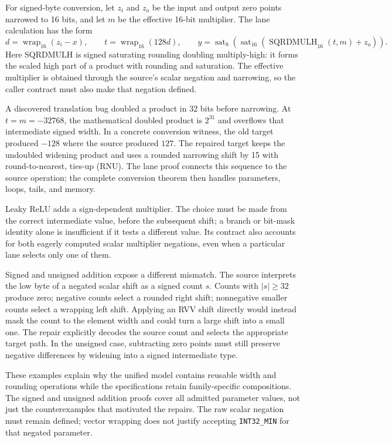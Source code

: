 \documentclass[11pt]{article}
\newcommand{\code}[1]{{\small\texttt{#1}}}
\begin{document}
For signed-byte conversion, let $z_i$ and $z_o$ be the input and output zero points narrowed to 16 bits, and let $m$ be the effective 16-bit multiplier. The lane calculation has the form
\[
 d=\operatorname{wrap}_{16}(z_i-x),\qquad
 t=\operatorname{wrap}_{16}(128d),\qquad
 y=\operatorname{sat}_{8}\!\left(
    \operatorname{sat}_{16}(\operatorname{SQRDMULH}_{16}(t,m)+z_o)\right).
\]
Here SQRDMULH is signed saturating rounding doubling multiply-high: it forms the scaled high part of a product with rounding and saturation. The effective multiplier is obtained through the source's scalar negation and narrowing, so the caller contract must also make that negation defined.

A discovered translation bug doubled a product in 32 bits before narrowing. At $t=m=-32768$, the mathematical doubled product is $2^{31}$ and overflows that intermediate signed width. In a concrete conversion witness, the old target produced $-128$ where the source produced $127$. The repaired target keeps the undoubled widening product and uses a rounded narrowing shift by 15 with round-to-nearest, ties-up (RNU). The lane proof connects this sequence to the source operation; the complete conversion theorem then handles parameters, loops, tails, and memory.

Leaky ReLU adds a sign-dependent multiplier. The choice must be made from the correct intermediate value, before the subsequent shift; a branch or bit-mask identity alone is insufficient if it tests a different value. Its contract also accounts for both eagerly computed scalar multiplier negations, even when a particular lane selects only one of them.

Signed and unsigned addition expose a different mismatch. The source interprets the low byte of a negated scalar shift as a signed count $s$. Counts with $|s|\ge32$ produce zero; negative counts select a rounded right shift; nonnegative smaller counts select a wrapping left shift. Applying an RVV shift directly would instead mask the count to the element width and could turn a large shift into a small one. The repair explicitly decodes the source count and selects the appropriate target path. In the unsigned case, subtracting zero points must still preserve negative differences by widening into a signed intermediate type.

These examples explain why the unified model contains reusable width and rounding operations while the specifications retain family-specific compositions. The signed and unsigned addition proofs cover all admitted parameter values, not just the counterexamples that motivated the repairs. The raw scalar negation must remain defined; vector wrapping does not justify accepting \code{INT32\_MIN} for that negated parameter.
\end{document}
